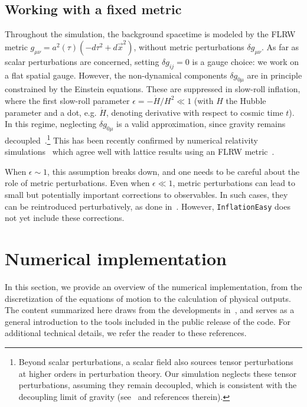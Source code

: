 \documentclass[aps, nofootinbib,superscriptaddress, preprintnumbers, longbibliography]{article}
\begin{document}
 
	\subsection{Working with a fixed metric}
	Throughout the simulation, the background spacetime is modeled by the FLRW metric $g_{\mu\nu} = a^2(\tau)(-d\tau^2 + d\vec{x}^2)$, without metric perturbations $\delta g_{\mu\nu}$. As far as scalar perturbations are concerned, setting $\delta g_{ij} = 0$ is a gauge choice: we work on a flat spatial gauge. However, the non-dynamical components $\delta g_{0\mu}$ are in principle constrained by the Einstein equations. These are suppressed in slow-roll inflation, where the first slow-roll parameter $\epsilon = -\dot{H}/H^2 \ll 1$ (with $H$ the Hubble parameter and a dot, e.g. $\dot{H}$, denoting derivative with respect to cosmic time $t$). In this regime, neglecting $\delta g_{0\mu}$ is a valid approximation, since gravity remains decoupled~\cite{Caravano:2022yyv,Caravano:2024moy}.\footnote{Beyond scalar perturbations, a scalar field also sources tensor perturbations at higher orders in perturbation theory. Our simulation neglects these tensor perturbations, assuming they remain decoupled, which is consistent with the decoupling limit of gravity (see~\cite{Caravano:2024moy,Caravano:2025diq} and references therein).}  This has been recently confirmed by numerical relativity simulations~\cite{Launay:2025kef} which agree well with lattice results using an FLRW metric~\cite{Caravano:2024tlp}.

When $\epsilon \sim 1$, this assumption breaks down, and one needs to be careful about the role of metric perturbations. Even when $\epsilon \ll 1$, metric perturbations can lead to small but potentially important corrections to observables. In such cases, they can be reintroduced perturbatively, as done in~\cite{Caravano:2024xsb, Jamieson:2025ngu}. However, \texttt{InflationEasy} does not yet include these corrections.
	
	
    \section{Numerical implementation}
    \label{sec:implementation}
    In this section, we provide an overview of the numerical implementation, from the discretization of the equations of motion to the calculation of physical outputs. The content summarized here draws from the developments in~\cite{Caravano:2021pgc,Caravano:2022yyv,Caravano:2024tlp,Caravano:2024moy, Caravano:2025diq, gwpaper, Caravano:2021bfn,Caravano:2022epk,Caravano:2024xsb}, and serves as a general introduction to the tools included in the public release of the code. For additional technical details, we refer the reader to these references.
\end{document}
